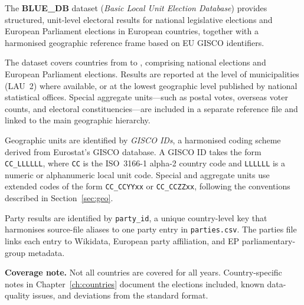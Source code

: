 The \textbf{BLUE\_DB} dataset (\textit{Basic Local Unit Election Database}) provides
structured, unit-level electoral results for national legislative elections and
European Parliament elections in European countries, together with a harmonised
geographic reference frame based on EU GISCO identifiers.

\medskip
\noindent
The dataset covers  countries from  to
, comprising  national elections and
 European Parliament elections.  Results are reported at
the level of municipalities (LAU~2) where available, or at the lowest
geographic level published by national statistical offices.  Special aggregate
units---such as postal votes, overseas voter counts, and electoral
constituencies---are included in a separate reference file and linked to the
main geographic hierarchy.

\medskip
\noindent
Geographic units are identified by \textit{GISCO IDs}, a harmonised coding
scheme derived from Eurostat's GISCO database.  A GISCO ID takes the form
\texttt{CC\_LLLLLL}, where \texttt{CC} is the ISO~3166-1 alpha-2 country code
and \texttt{LLLLLL} is a numeric or alphanumeric local unit code.  Special and
aggregate units use extended codes of the form \texttt{CC\_CCYYxx} or
\texttt{CC\_CCZZxx}, following the conventions described in
Section~\ref{sec:geo}.

\medskip
\noindent
Party results are identified by \texttt{party\_id}, a unique country-level
key that harmonises source-file aliases to one party entry in
\texttt{parties.csv}.  The parties file links each entry to Wikidata,
European party affiliation, and EP parliamentary-group metadata.

\medskip
\noindent
\textbf{Coverage note.}  Not all countries are covered for all years.
Country-specific notes in Chapter~\ref{ch:countries} document the elections
included, known data-quality issues, and deviations from the standard format.
